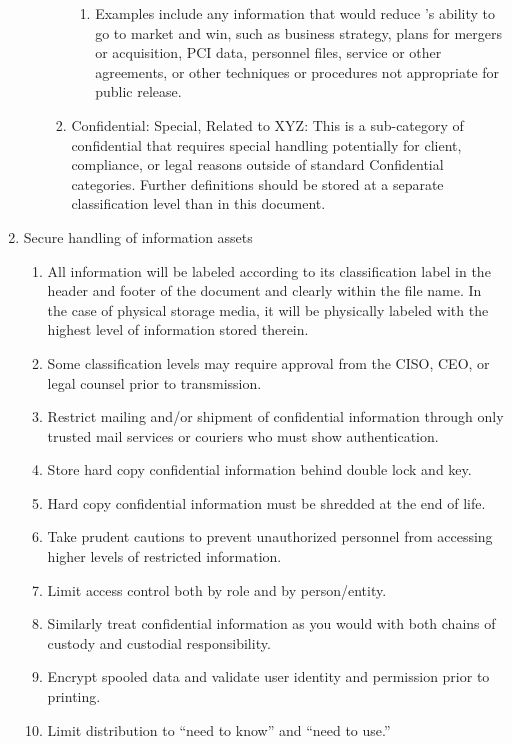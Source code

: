 \documentclass[../main.tex]{subfiles}
\begin{document}
\begin{enumerate}
\begin{enumerate}
\begin{enumerate}
\begin{enumerate}
                \item Examples include any information that would reduce \CompanyName's ability to go to market and win, such as business strategy, plans for mergers or acquisition, PCI data, personnel files, service or other agreements, or other techniques or procedures not appropriate for public release.
            \end{enumerate}
            \item Confidential: Special, Related to XYZ: This is a sub-category of confidential that requires special handling potentially for client, compliance, or legal reasons outside of standard Confidential categories. Further definitions should be stored at a separate classification level than in this document.
        \end{enumerate}
    \end{enumerate}
    \item Secure handling of information assets
    \begin{enumerate}
        \item All information will be labeled according to its classification label in the header and footer of the document and clearly within the file name. In the case of physical storage media, it will be physically labeled with the highest level of information stored therein.
        \item Some classification levels may require approval from the CISO, CEO, or legal counsel prior to transmission.
        \item Restrict mailing and/or shipment of confidential information through only trusted mail services or couriers who must show authentication.
        \item Store hard copy confidential information behind double lock and key.
        \item Hard copy confidential information must be shredded at the end of life.
        \item Take prudent cautions to prevent unauthorized personnel from accessing higher levels of restricted information.
        \item Limit access control both by role and by person/entity.
        \item Similarly treat confidential information as you would with both chains of custody and custodial responsibility.
        \item Encrypt spooled data and validate user identity and permission prior to printing.
        \item Limit distribution to “need to know” and “need to use.”

\end{enumerate}
\end{enumerate}
\end{document}
